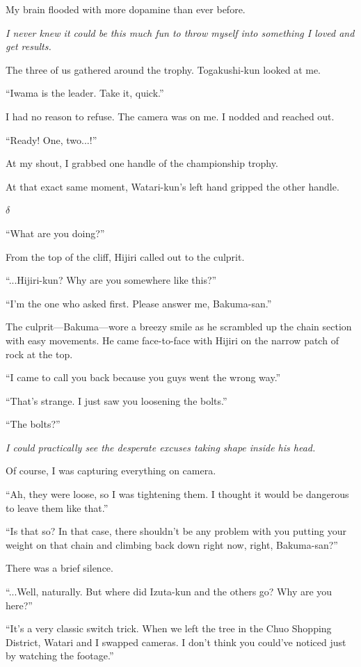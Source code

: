 \documentclass[
    a4paper,
    12pt,
    twoside,
    openany,
    UTF8,
    fontset=windows
]{ctexbook}
\begin{document}
My brain flooded with more dopamine than ever before.

\textit{I never knew it could be this much fun to throw myself into something I loved and get results.}

The three of us gathered around the trophy. Togakushi-kun looked at me.

``Iwama is the leader. Take it, quick.''

I had no reason to refuse. The camera was on me. I nodded and reached out.

``Ready! One, two...!''

At my shout, I grabbed one handle of the championship trophy.

At that exact same moment, Watari-kun's left hand gripped the other handle.

$\delta$

``What are you doing?''

From the top of the cliff, Hijiri called out to the culprit.

``...Hijiri-kun? Why are you somewhere like this?''

``I'm the one who asked first. Please answer me, Bakuma-san.''

The culprit---Bakuma---wore a breezy smile as he scrambled up the chain section with easy movements. He came face-to-face with Hijiri on the narrow patch of rock at the top.

``I came to call you back because you guys went the wrong way.''

``That's strange. I just saw you loosening the bolts.''

``The bolts?''

\textit{I could practically see the desperate excuses taking shape inside his head.}

Of course, I was capturing everything on camera.

``Ah, they were loose, so I was tightening them. I thought it would be dangerous to leave them like that.''

``Is that so? In that case, there shouldn't be any problem with you putting your weight on that chain and climbing back down right now, right, Bakuma-san?''

There was a brief silence.

``...Well, naturally. But where did Izuta-kun and the others go? Why are you here?''

``It's a very classic switch trick. When we left the tree in the Chuo Shopping District, Watari and I swapped cameras. I don't think you could've noticed just by watching the footage.''
\end{document}
